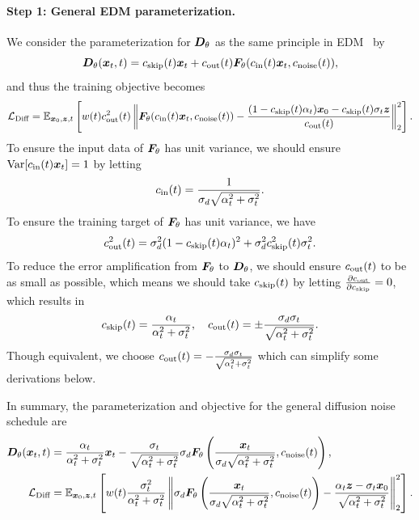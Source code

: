 \paragraph{Step 1: General EDM parameterization.} We consider the parameterization for ${\bm{D}}_\theta$ as the same principle in EDM~\citep{karras2022edm} by
\begin{equation}
    {\bm{D}}_\theta({\bm{x}}_t,t) = c_{\text{skip}}(t){\bm{x}}_t + c_{\text{out}}(t) {\bm{F}}_\theta(c_{\text{in}}(t){\bm{x}}_t, c_{\text{noise}}(t)),
\end{equation}
and thus the training objective becomes
\begin{equation}
    {\mathcal{L}}_{\text{Diff}} = \mathbb{E}_{{\bm{x}}_0,{\bm{z}},t}\left[
        w(t)c_{\text{out}}^2(t) \left\| {\bm{F}}_\theta(c_{\text{in}}(t){\bm{x}}_t,c_{\text{noise}}(t))
        - \frac{(1-c_{\text{skip}}(t)\alpha_t) {\bm{x}}_0 - c_{\text{skip}}(t)\sigma_t{\bm{z}}}{c_{\text{out}}(t)}
        \right\|_2^2
    \right].
\end{equation}
To ensure the input data of ${\bm{F}}_\theta$ has unit variance, we should ensure $\mathrm{Var}[c_{\text{in}}(t){\bm{x}}_t] = 1$ by letting
\begin{equation}
    c_{\text{in}}(t) = \frac{1}{\sigma_d \sqrt{\alpha_t^2 + \sigma_t^2}}.
\end{equation}
To ensure the training target of ${\bm{F}}_\theta$ has unit variance, we have
\begin{equation}
    c_{\text{out}}^2(t) = \sigma_d^2 (1 - c_{\text{skip}}(t)\alpha_t)^2 + \sigma_d^2c_{\text{skip}}^2(t)\sigma_t^2.
\end{equation}
To reduce the error amplification from ${\bm{F}}_\theta$ to ${\bm{D}}_\theta$, we should ensure $c_{\text{out}}(t)$ to be as small as possible, which means we should take $c_{\text{skip}}(t)$ by letting $\frac{\partial c_{\text{out}}}{\partial c_{\text{skip}}} = 0$, which results in
\begin{equation}
\begin{split}
    c_{\text{skip}}(t) = \frac{\alpha_t}{\alpha_t^2 + \sigma_t^2},\quad c_{\text{out}}(t) = \pm\frac{\sigma_d\sigma_t}{\sqrt{\alpha_t^2 + \sigma_t^2}}.
\end{split}
\end{equation}
Though equivalent, we choose $c_{\text{out}}(t) = -\frac{\sigma_d\sigma_t}{\sqrt{\alpha_t^2 + \sigma_t^2}}$ which can simplify some derivations below.

In summary, the parameterization and objective for the general diffusion noise schedule are
\begin{align}
    {\bm{D}}_\theta({\bm{x}}_t,t) &= \frac{\alpha_t}{\alpha_t^2 + \sigma_t^2}{\bm{x}}_t - \frac{\sigma_t}{\sqrt{\alpha_t^2 + \sigma_t^2}} \sigma_d{\bm{F}}_\theta\left(\frac{{\bm{x}}_t}{\sigma_d \sqrt{\alpha_t^2 + \sigma_t^2}}, c_{\text{noise}}(t)\right), \\
    {\mathcal{L}}_{\text{Diff}} &= \mathbb{E}_{{\bm{x}}_0,{\bm{z}},t}\left[
        w(t) \frac{\sigma^2_t}{\alpha_t^2 + \sigma_t^2}
        \left\| \sigma_d {\bm{F}}_\theta\left(\frac{{\bm{x}}_t}{\sigma_d \sqrt{\alpha_t^2 + \sigma_t^2}}, c_{\text{noise}}(t)\right)
        - \frac{\alpha_t {\bm{z}} - \sigma_t {\bm{x}}_0}{\sqrt{\alpha_t^2 + \sigma_t^2}}
        \right\|_2^2
    \right].
\end{align}

